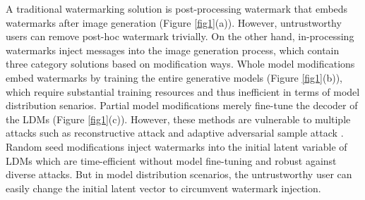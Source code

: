 A traditional watermarking solution is post-processing watermark that embeds watermarks after image generation (Figure \ref{fig1}(a)). However, untrustworthy users can remove post-hoc watermark trivially. %
On the other hand, in-processing watermarks inject messages into the image generation process, which contain three category solutions based on modification ways. Whole model modifications \cite{zhao2023recipe,feng2024aqualora} embed watermarks by training the entire generative models (Figure \ref{fig1}(b)), which require substantial training resources and thus inefficient in terms of model distribution senarios. Partial model modifications \cite{fernandez2023stable,xiong2023flexible} merely fine-tune the decoder of the LDMs (Figure \ref{fig1}(c)). However, these methods are vulnerable to multiple attacks \cite{an2024benchmarking} such as reconstructive attack \cite{zhao2023invisible} and adaptive adversarial sample attack \cite{jiang2023evading}. Random seed modifications \cite{wen2024tree,yang2024gaussian,ci2025ringid} 
inject watermarks into the initial latent variable of LDMs which are time-efficient without model fine-tuning and robust against diverse attacks. But in model distribution scenarios, the untrustworthy user can easily change the initial latent vector to circumvent watermark injection.


